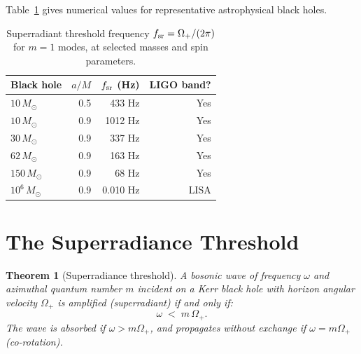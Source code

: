 \documentclass[12pt]{article}
\newtheorem{theorem}{Theorem}[section]
\newcommand{\Oplus}{\Omega_+}
\begin{document}
Table~\ref{tab:omega} gives numerical values for representative
astrophysical black holes.

\begin{table}[h]
\centering
\caption{Superradiant threshold frequency $f_{\rm sr} = \Oplus/(2\pi)$
for $m=1$ modes, at selected masses and spin parameters.}
\label{tab:omega}
\renewcommand{\arraystretch}{1.3}
\begin{tabular}{@{}lrrr@{}}
\toprule
Black hole & $a/M$ & $f_{\rm sr}$ (Hz) & LIGO band? \\
\midrule
$10\,M_\odot$  & 0.5  &  433 Hz & Yes \\
$10\,M_\odot$  & 0.9  & 1012 Hz & Yes \\
$30\,M_\odot$  & 0.9  &  337 Hz & Yes \\
$62\,M_\odot$  & 0.9  &  163 Hz & Yes \\
$150\,M_\odot$ & 0.9  &   68 Hz & Yes \\
$10^6\,M_\odot$ & 0.9 &  0.010 Hz & LISA \\
\bottomrule
\end{tabular}
\end{table}

\section{The Superradiance Threshold}
\label{sec:threshold}

\begin{theorem}[Superradiance threshold]
\label{thm:threshold}
A bosonic wave of frequency $\omega$ and azimuthal quantum number $m$
incident on a Kerr black hole with horizon angular velocity $\Oplus$
is amplified (superradiant) if and only if:
\begin{equation}
  \boxed{\omega \;<\; m\,\Oplus.}
  \label{eq:threshold}
\end{equation}
The wave is absorbed if $\omega > m\Oplus$, and propagates without
exchange if $\omega = m\Oplus$ (co-rotation).
\end{theorem}
\end{document}
